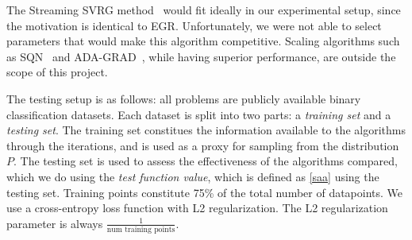 \documentclass[11pt]{article}
\begin{document}

The Streaming SVRG method~\cite{Frostig:2014aa} would fit ideally in our experimental setup, since the motivation is identical to EGR. Unfortunately, we were not able to select parameters that would make this algorithm competitive. Scaling algorithms such as SQN~\cite{sammy} and ADA-GRAD~\cite{duchihazansing}, while having superior performance, are outside the scope of this project.
 
 The testing setup is as follows: all problems are publicly available binary classification datasets. Each dataset is split into two parts: a \emph{training set} and a \emph{testing set}. The training set constitues the information available to the algorithms through the iterations, and is used as a proxy for sampling from the distribution $P$. The testing set is used to assess the effectiveness of the algorithms compared, which we do using the \emph{test function value}, which is defined as \eqref{saa} using the testing set. Training points constitute 75\% of the total number of datapoints. We use a cross-entropy loss function with L2 regularization. The L2 regularization parameter is always $\frac{1}{\mbox{num training points}}$.
\end{document}
